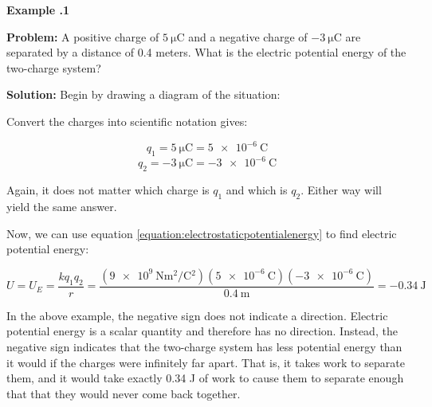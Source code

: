 	\begin{mdframed}[backgroundcolor=blue!10!white]
		\begin{center}
			
			
			\textbf{Example \thesection.1}	
		\end{center}
		\vspace{0.1in}
		\textbf{Problem: } A positive charge of $\SI{5}{\micro\coulomb}$ and a negative charge of $\SI{-3}{\micro\coulomb}$ are separated by a distance of 0.4 meters. What is the electric potential energy of the two-charge system?
		
		\vspace{0.2in}
		
		
		\textbf{Solution:} 
		Begin by drawing a diagram of the situation: 
		
		
		\begin{center}
		\end{center}			
		
		Convert the charges into scientific notation gives:
		
		\begin{equation*}
			q_1 = \SI{5}{\micro\coulomb} = \SI{5e-6}{\coulomb}
		\end{equation*}	
		\begin{equation*}
			q_2 = \SI{-3}{\micro\coulomb} = \SI{-3e-6}{\coulomb}
		\end{equation*}	
		
		Again, it does not matter which charge is $q_1$ and which is $q_2$. Either way will yield the same answer.
		
		Now, we can use equation \ref{equation:electrostaticpotentialenergy} to find electric potential energy:
		
		
		
		
		\begin{equation*}
			U =	U_E = \frac{kq_1q_2}{r} = \frac{(\SI{9e9}{\N\m^2\per\coulomb^2})
				(\SI{5e-6}{\coulomb})
				(\SI{-3e-6}{\coulomb})}
			{\SI{0.4}{\m}}
			= \boxed{\SI{-0.34}{\J}}
		\end{equation*}
	\end{mdframed}

	In the above example, the negative sign does not indicate a direction. Electric potential energy is a scalar quantity and therefore has no direction. Instead, the negative sign indicates that the two-charge system has less potential energy than it would if the charges were infinitely far apart.  That is, it takes work to separate them, and it would take exactly 0.34 J of work to cause them to separate enough that that they would never come back together.  		
	
